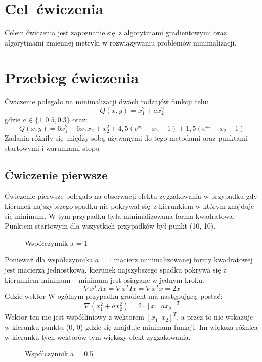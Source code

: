 \documentclass[a4paper, 10pt]{article}
\begin{document}
    \noindent
	\section{Cel ćwiczenia}
		Celem ćwiczenia jest zapoznanie się z algorytmami gradientowymi oraz algorytmami zmiennej metryki w rozwiązywaniu problemów minimalizacji.
	\section{Przebieg ćwiczenia}
		Ćwiczenie polegało na minimalizacji dwóch rodzajów funkcji celu:
		$$
			Q(x,y) = x_1^2 + a x_2^2
		$$
		gdzie $a \in \{1, 0.5, 0.3 \}$ oraz:
		$$
			Q(x,y) = 6x_1^2 + 6x_1x_2 + x_2^2 +4,5(e^{x_1}-x_1-1) + 1,5(e^{x_2} -x_2-1)
		$$
		Zadania różniły się między sobą używanymi do tego metodami oraz punktami startowymi i warunkami stopu
	    \subsection{Ćwiczenie pierwsze}
		    Ćwiczenie pierwsze polegało na obserwacji efektu zygzakowania w przypadku gdy kierunek najszybszego spadku nie pokrywał się z kierunkiem w którym znajduje się minimum. W tym przypadku była minimalizowana forma kwadratowa. Punktem startowym dla wszystkich przypadków był punkt (10, 10).
		    \begin{figure}[H]
		        \centering
		        \def \svgwidth{0.75\columnwidth}
		        
		        \caption{Współczynnik a = 1}
		    \end{figure}\noindent
			Ponieważ dla współczynnika $a = 1$ macierz minimalizowanej formy kwadratowej jest macierzą jednostkową, kierunek najszybszego spadku pokrywa się z kierunkiem minimum -- minimum jest osiągane w jednym kroku.
			$$
				\nabla x^T A x = \nabla x^T I x = \nabla x^T x = 2 x
			$$
			Gdzie wektor W ogólnym przypadku gradient ma następującą postać:
			$$
				\nabla ( x_1^2 + a x_2^2) = 2 \cdot \left[x_1 \,\,\, ax_2\right]^T
			$$ 
			Wektor ten nie jest współliniowy z wektorem $ \left[x_1 \,\,\,x_2\right]^T$, a przez to nie wskazuje w kierunku punktu (0, 0) gdzie się znajduje minimum funkcji. Im większa różnica w kierunku tych wektorów tym większy efekt zygzakowania.
		    \begin{figure}[H]
		        \centering
		        \def \svgwidth{0.75\columnwidth}
		        
		        \caption{Współczynnik a = 0.5}
		    \end{figure}\noindent
		
\end{document}
